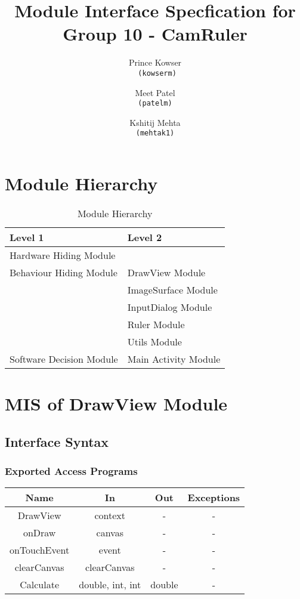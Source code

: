 \documentclass[12,english]{article}
\title{Module Interface Specfication for Group 10 - CamRuler}
\author{Prince Kowser\\
\texttt{ (kowserm)}
\and
Meet Patel\\
\texttt{(patelm)}
\and
Kshitij Mehta\\
\texttt{(mehtak1)}
}
\date{}
\begin{document}
\maketitle
\newpage
\tableofcontents
\newpage

\section{Module Hierarchy}
\begin{table}[!htbp]
        \begin{tabular}{ll}
        \toprule
        Level 1 & Level 2 \\
        \midrule
        Hardware Hiding Module & \\
         \midrule
        Behaviour Hiding Module & DrawView Module \\
        & ImageSurface Module\\
        & InputDialog Module\\
        & Ruler Module\\ 
		& Utils Module \\
		 \midrule
        Software Decision Module & Main Activity Module\\
        
        \bottomrule
        \end{tabular}
        \caption{Module Hierarchy}
        \makeatletter
           \def\rulecolor#1#{\CT@arc{#1}}
           \def\CT@arc#1#2{%
           \ifdim\baselineskip=\z@\noalign\fi
           {\gdef\CT@arc@{\color#1{#2}}}}
           \let\CT@arc@\relax
        \makeatother
        \label{Table 1}
        \end{table}

\section{MIS of DrawView Module}
		\subsection{Interface Syntax}
		\subsubsection{Exported Access Programs}
		\begin{tabular}[pos]{|c|c|c|c|}
			
			\hline
			\textbf{Name}& \textbf{In} & \textbf{Out} & \textbf{Exceptions} \\ \hline
			DrawView & context & -  & -\\ \hline
			onDraw & canvas & -  & -\\ \hline
			onTouchEvent & event & -  & -\\ \hline
			clearCanvas & clearCanvas & -  & -\\ \hline
			Calculate & double, int, int & double  & -\\ \hline
		\end{tabular}
		
\end{document}
